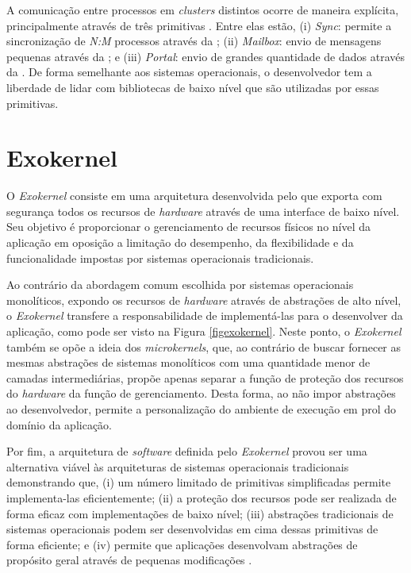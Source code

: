 \documentclass[
  12pt,       %
  openright,      %
  twoside,      %
  a4paper,      %
  english,      %
  brazil,       %
  ]{abntex2}
\begin{document}
        A comunicação entre processos em \textit{clusters} distintos ocorre
        de maneira explícita, principalmente  através de três primitivas \ipc.
        Entre elas estão,
        (i) \textit{Sync}: permite a sincronização de \textit{N:M} processos através da \cnoc;
        (ii) \textit{Mailbox}: envio de mensagens pequenas através da \dnoc; e
        (iii) \textit{Portal}: envio de grandes quantidade de dados através da \dnoc.
        De forma semelhante aos sistemas operacionais, o desenvolvedor tem a
        liberdade de lidar com bibliotecas de baixo nível que são utilizadas
        por essas primitivas.
    
    \section{Exokernel}
    \label{sec:exokernel}
    
        O \textit{Exokernel} consiste em uma arquitetura desenvolvida
        pelo \unimit que exporta com segurança todos os
        recursos de \textit{hardware} através de uma interface de baixo nível.
        Seu objetivo é proporcionar o gerenciamento de recursos físicos
        no nível da aplicação em oposição a limitação do desempenho, da
        flexibilidade e da funcionalidade impostas por sistemas operacionais 
        tradicionais.

        Ao contrário da abordagem comum escolhida por sistemas operacionais
        monolíticos, expondo os recursos de \textit{hardware} através de abstrações
        de alto nível, o \textit{Exokernel} transfere a responsabilidade de
        implementá-las para o desenvolver da aplicação, como pode ser visto
        na Figura \ref{figexokernel}.
        Neste ponto, o \textit{Exokernel} também se opõe a ideia dos 
        \textit{microkernels}, que, ao contrário de buscar fornecer as
        mesmas abstrações de sistemas monolíticos com uma quantidade menor
        de camadas intermediárias, propõe apenas separar a função de proteção
        dos recursos do \textit{hardware} da função de gerenciamento.
        Desta forma, ao não impor abstrações ao desenvolvedor, permite a
        personalização do ambiente de execução em prol do domínio da aplicação.
                
        Por fim, a arquitetura de \textit{software} definida pelo \textit{Exokernel}
        provou ser uma alternativa viável às arquiteturas de sistemas
        operacionais tradicionais demonstrando que, 
        (i) um número limitado de primitivas simplificadas permite 
        implementa-las eficientemente; 
        (ii) a proteção dos recursos pode ser realizada de forma eficaz com
        implementações de baixo nível; (iii) abstrações tradicionais de
        sistemas operacionais podem ser desenvolvidas em cima dessas
        primitivas de forma eficiente; e 
        (iv) permite que aplicações desenvolvam abstrações de propósito
        geral através de pequenas modificações \cite{engler_exokernel:_1995}.
\end{document}
